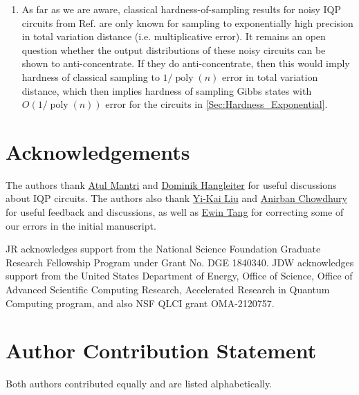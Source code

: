 \documentclass[a4paper,onecolumn,11pt,accepted=2017-05-09]{quantumarticle}
\DeclareMathOperator{\poly}{poly}
\begin{document}
\begin{enumerate}
    \item As far as we are aware, classical hardness-of-sampling results for noisy IQP circuits from Ref. \cite{fujii2016computational} are only known for sampling to exponentially high precision in total variation distance (i.e. multiplicative error). 
    It remains an open question whether the output distributions of these noisy circuits can be shown to anti-concentrate. 
    If they do anti-concentrate, then this would imply hardness of classical sampling to $1/\poly(n)$ error in total variation distance, which then implies hardness of sampling Gibbs states with $O(1/\poly(n))$ error for the circuits in \cref{Sec:Hardness_Exponential}.

 \end{enumerate}

 
	
	
	\section*{Acknowledgements}

 {\begingroup
		\hypersetup{urlcolor=navyblue}

  The authors thank \href{https://orcid.org/0009-0008-5983-9130}{Atul Mantri} and \href{https://orcid.org/0000-0002-4766-7967}{Dominik Hangleiter} for useful discussions about IQP circuits.
 The authors also thank \href{https://orcid.org/0000-0001-7458-4721}{Yi-Kai Liu} and  \href{https://orcid.org/0000-0001-9743-7978}{Anirban Chowdhury} for useful feedback and discussions, as well as \href{https://orcid.org/0000-0002-7451-9687}{Ewin Tang} for correcting some of our errors in the initial manuscript.
		\endgroup}
    
	
	
    JR acknowledges support from the National Science Foundation Graduate Research Fellowship Program under Grant No. DGE 1840340.
    JDW acknowledges support from the United States Department of Energy, Office of Science, Office of Advanced Scientific Computing Research, Accelerated Research in Quantum Computing program, and also NSF QLCI grant OMA-2120757.

 \section*{Author Contribution Statement}

 Both authors contributed equally and are listed alphabetically.
	
	
\end{document}
